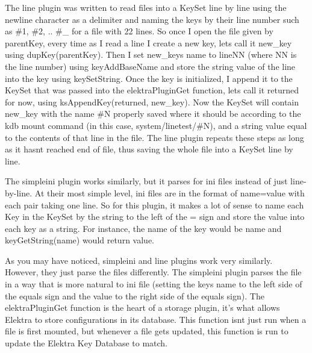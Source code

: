 The line plugin was written to read files into a {\ttfamily Key\+Set} line by line using the newline character as a delimiter and naming the keys by their line number such as {\ttfamily \#1}, {\ttfamily \#2}, .. {\ttfamily \#\+\_} for a file with 22 lines. So once I open the file given by {\ttfamily parent\+Key}, every time as I read a line I create a new key, let\textquotesingle{}s call it {\ttfamily new\+\_\+key} using {\ttfamily dup\+Key(parent\+Key)}. Then I set {\ttfamily new\+\_\+key}\textquotesingle{}s name to {\ttfamily line\+NN} (where NN is the line number) using {\ttfamily key\+Add\+Base\+Name} and store the string value of the line into the key using {\ttfamily key\+Set\+String}. Once the key is initialized, I append it to the {\ttfamily Key\+Set} that was passed into the {\ttfamily elektra\+Plugin\+Get} function, let\textquotesingle{}s call it {\ttfamily returned} for now, using {\ttfamily ks\+Append\+Key(returned, new\+\_\+key)}. Now the {\ttfamily Key\+Set} will contain {\ttfamily new\+\_\+key} with the name {\ttfamily \#N} properly saved where it should be according to the {\ttfamily kdb mount} command (in this case, {\ttfamily system/linetest/\#N}), and a string value equal to the contents of that line in the file. The line plugin repeats these steps as long as it hasn\textquotesingle{}t reached end of file, thus saving the whole file into a {\ttfamily Key\+Set} line by line.

The {\ttfamily simpleini} plugin works similarly, but it parses for {\ttfamily ini} files instead of just line-\/by-\/line. At their most simple level, {\ttfamily ini} files are in the format of {\ttfamily name=value} with each pair taking one line. So for this plugin, it makes a lot of sense to name each {\ttfamily Key} in the {\ttfamily Key\+Set} by the string to the left of the {\ttfamily =} sign and store the value into each key as a string. For instance, the name of the key would be {\ttfamily name} and {\ttfamily key\+Get\+String(name)} would return {\ttfamily value}.

As you may have noticed, {\ttfamily simpleini} and line plugins work very similarly. However, they just parse the files differently. The {\ttfamily simpleini} plugin parses the file in a way that is more natural to {\ttfamily ini} file (setting the key\textquotesingle{}s name to the left side of the equals sign and the value to the right side of the equals sign). The {\ttfamily elektra\+Plugin\+Get} function is the heart of a storage plugin, it’s what allows Elektra to store configurations in its database. This function isn\textquotesingle{}t just run when a file is first mounted, but whenever a file gets updated, this function is run to update the Elektra Key Database to match.

